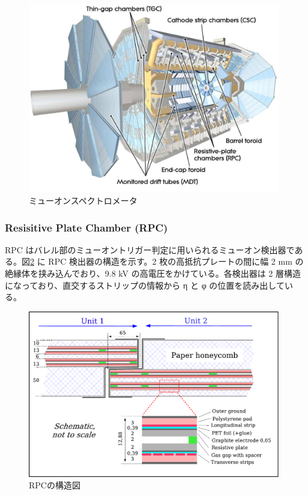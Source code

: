 \begin{figure}[tb]
  \centering
  \includegraphics[clip, width=11cm]{fig/2/MuonSystem_d3.pdf}
  \caption{ミューオンスペクトロメータ}
  \label{fig:ミューオン}
\end{figure}

\subsubsection{Resisitive Plate Chamber (RPC)}
RPC はバレル部のミューオントリガー判定に用いられるミューオン検出器である。図\ref{fig:RPC} に RPC 検出器の構造を示す。2 枚の高抵抗プレートの間に幅 2 mm の絶縁体を挟み込んでおり、9.8 kV の高電圧をかけている。各検出器は 2 層構造になっており、直交するストリップの情報から η と φ の位置を読み出している。

\begin{figure}[tb]
  \centering
  \includegraphics[clip, width=11cm]{fig/2/RPC_structure.pdf}
  \caption{RPCの構造図}
  \label{fig:RPC}
\end{figure}

